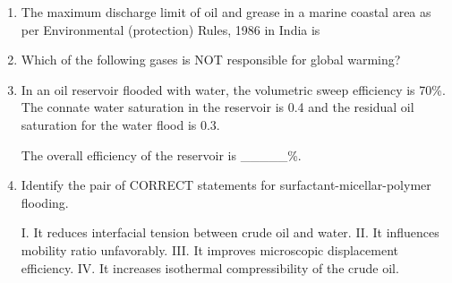 \documentclass[journal]{IEEEtran}
\begin{document}
\begin{enumerate}
    \hfill{}
    
    \item The maximum discharge limit of oil and grease in a marine coastal area as per Environmental (protection) Rules, 1986 in India is
    
    \begin{enumerate}  \end{enumerate}              
    
    \hfill{}
    
    \item Which of the following gases is NOT responsible for global warming?
    
    \begin{enumerate}  \end{enumerate}              
    
    \hfill{}
    
    \item In an oil reservoir flooded with water, the volumetric sweep efficiency is 70\%. The connate water saturation in the reservoir is 0.4 and the residual oil saturation for the water flood is 0.3.
    
    The overall efficiency of the reservoir is \_\_\_\_\_\%.
    
    \hfill{}
    
    \item Identify the pair of CORRECT statements for surfactant-micellar-polymer flooding.
    
    I. It reduces interfacial tension between crude oil and water.
    II. It influences mobility ratio unfavorably.
    III. It improves microscopic displacement efficiency.
    IV. It increases isothermal compressibility of the crude oil.
    

\end{enumerate}
\end{document}
